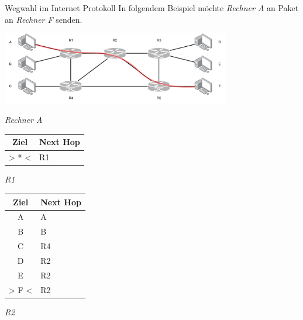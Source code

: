 \begin{example}{Wegwahl im Internet Protokoll}
    In folgendem Beispiel möchte \emph{Rechner A} an Paket an \emph{Rechner F} senden.

    \begin{center}
        \includegraphics[width=0.75\textwidth]{includes/figures/example_ip_routing.pdf }
    \end{center}

    \begin{minipage}{0.25\textwidth}
        \begin{center}
            \emph{Rechner A}

            \begin{tabular}{|c|l|}
                \hline
                \textbf{Ziel} & \textbf{Next Hop} \\\hline
                > * <         & R1                \\\hline
            \end{tabular}
        \end{center}
    \end{minipage}
    \begin{minipage}{0.25\textwidth}
        \begin{center}
            \emph{R1}

            \begin{tabular}{|c|l|}
                \hline
                \textbf{Ziel} & \textbf{Next Hop} \\\hline
                A             & A                 \\
                B             & B                 \\
                C             & R4                \\
                D             & R2                \\
                E             & R2                \\
                > F <         & R2                \\\hline
            \end{tabular}
        \end{center}
    \end{minipage}
    \begin{minipage}{0.25\textwidth}
        \begin{center}
            \emph{R2}


\end{center}
\end{minipage}
\end{example}
